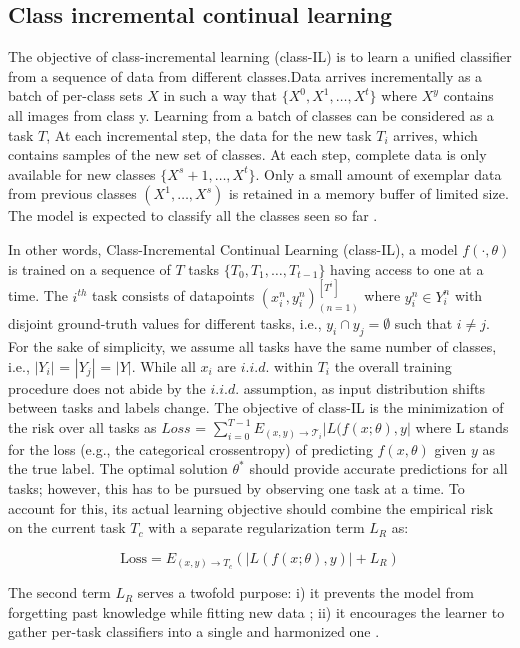 \documentclass{article}
\begin{document}
\subsection{Class incremental continual learning}

The objective of class-incremental learning (class-IL) is to learn a unified classifier from a sequence of data from different classes.Data arrives incrementally as a batch of
per-class sets ${X}$ in such a way that $\{X^0, X^1, \ldots, X^{t}\}$ where ${X^y}$
contains all images from class y. Learning from a batch of classes
can be considered as a task $T$, At each incremental step,
the data for the new task $T_i$ arrives, which contains samples
of the new set of classes. At each step, complete data is only available for new classes $\{X^s+1,  \ldots, X^{t}\}$. Only a small amount of exemplar data from previous classes $({X^1,  \ldots, X^{s}})$ is retained in a memory buffer of limited size. The model is expected to classify all the classes seen so far \cite{mittal2021essentials}.


In other words, Class-Incremental Continual Learning (class-IL), a model $ f(\cdot, \theta) $ is trained on a sequence of $T$ tasks $\{T_0, T_1, \ldots, T_{t-1}\}$ having access to one at a time. The $i^{th}$ task consists of datapoints $\left(x_i^{n}, y_i^{n}\right)_{(n=1)} ^ {[T^i]}$ where $y_i^{n} \in Y_i^{n}$ with disjoint ground-truth values for different tasks, i.e.,  $y_i \cap y_j = \emptyset$ such that $i \neq j$. For the sake of simplicity, we assume all tasks have the same number of classes, i.e., $| Y_i | $ = $| Y_j |$ = $| Y | $. While all ${x_i}$ are $i.i.d. $ within $T_i$ the overall training procedure does not abide by the $i.i.d. $ assumption, as input distribution shifts
between tasks and labels change. The objective of class-IL is the minimization of the risk over all tasks as $Loss$ = $\sum_{i=0}^{T-1} E_{(x,y) \rightarrow \mathcal{T}_i} \left| L(f(x;\theta),y \right|$
where L stands for the loss (e.g., the categorical crossentropy) of predicting $f(x,\theta)$ given $y$ as the true label. The optimal solution  $\theta^ * $ should provide accurate predictions for
all tasks; however, this has to be pursued by observing one
task at a time. To account for this, its actual learning objective should combine the empirical risk on the current task $T_c$ with a separate regularization term $L_R$ as:

\[
\text{Loss} = E_{(x,y)\rightarrow T_c} \left(|L(f(x;\theta),y)| + L_R\right)
\] 

The second term $L_R$ serves a twofold purpose: i) it prevents
the model from forgetting past knowledge while fitting new
data \cite{robins1995catastrophic} ; ii) it encourages the learner to gather per-task classifiers into a single and harmonized one \cite{boschini2022class}.
\end{document}
